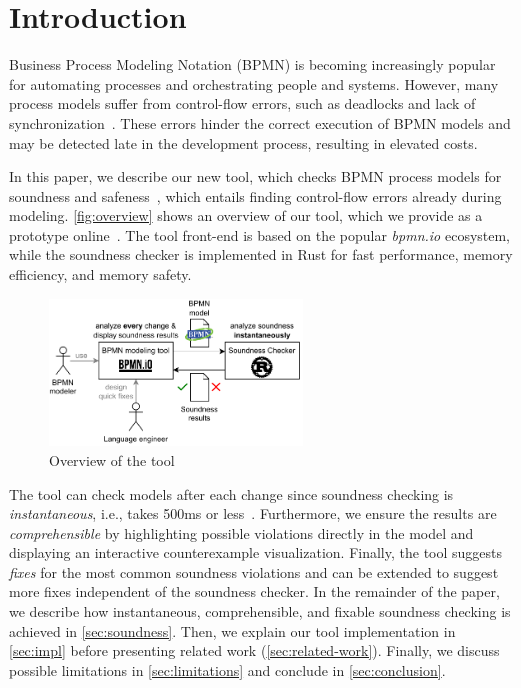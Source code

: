 \documentclass[runningheads]{llncs}
\begin{document}
\section{Introduction} \label{sec:introduction}


Business Process Modeling Notation (BPMN) is becoming increasingly popular for automating processes and orchestrating people and systems.
However, many process models suffer from control-flow errors, such as deadlocks and lack of synchronization~\cite{fahlandAnalysisDemandInstantaneous2011}.
These errors hinder the correct execution of BPMN models and may be detected late in the development process, resulting in elevated costs.

In this paper, we describe our new tool, which checks BPMN process models for soundness and safeness~\cite{corradiniClassificationBPMNCollaborations2018}, which entails finding control-flow errors already during modeling.
\autoref{fig:overview} shows an overview of our tool, which we provide as a prototype online~\cite{noauthorgivenBPM2024Artifacts2024}.
The tool front-end is based on the popular \textit{bpmn.io} ecosystem, while the soundness checker is implemented in Rust for fast performance, memory efficiency, and memory safety.

\begin{figure}[ht]
	\centering
	\includegraphics[width=0.6\textwidth]{images/overview}
	\caption{Overview of the tool}
	\label{fig:overview}
\end{figure}

The tool can check models after each change since soundness checking is \textit{instantaneous}, i.e., takes 500ms or less~\cite{fahlandAnalysisDemandInstantaneous2011}.
Furthermore, we ensure the results are \textit{comprehensible} by highlighting possible violations directly in the model and displaying an interactive counterexample visualization.
Finally, the tool suggests \textit{fixes} for the most common soundness violations and can be extended to suggest more fixes independent of the soundness checker. 
In the remainder of the paper, we describe how instantaneous, comprehensible, and fixable soundness checking is achieved in \autoref{sec:soundness}.
Then, we explain our tool implementation in \autoref{sec:impl} before presenting related work (\autoref{sec:related-work}).
Finally, we discuss possible limitations in \autoref{sec:limitations} and conclude in \autoref{sec:conclusion}.
\end{document}
